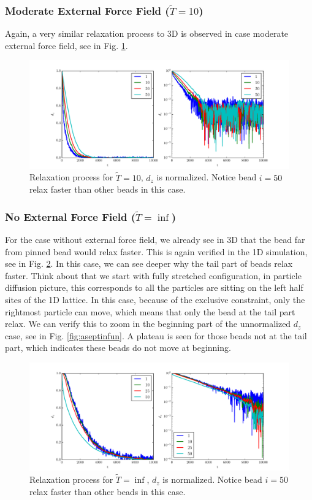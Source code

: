 \documentclass[12pt,a4paper]{article}
\begin{document}
\subsubsection{Moderate External Force Field ($\tilde{T} = 10$)}
Again, a very similar relaxation process to 3D is observed in case moderate
external force field, see in Fig. \ref{fig:asept10}.
\begin{figure}[htpb]
    \centering
    \includegraphics[width=1.0\linewidth]{fig4report/asep_N100_T10.pdf}
    \caption{Relaxation process for $\tilde{T}=10$, $d_z$ is normalized.
        Notice bead $i=50$ relax faster than other beads in this case.} 
    \label{fig:asept10}
\end{figure}

\subsubsection{No External Force Field ($\tilde{T}=\inf$)}
\label{sec:1dtinf}
For the case without external force field, we already see in 3D that the bead
far from pinned bead would relax faster. This is again verified in the 1D
simulation, see in Fig. \ref{fig:aseptinf}. In this case, we can see deeper why
the tail part of beads relax faster. Think about that we start with fully stretched
configuration, in particle diffusion picture, this corresponds to all the
particles are sitting on the left half sites of the 1D lattice. In this case,
because of the exclusive constraint, only the rightmost particle can move, which
means that only the bead at the tail part relax. We can verify this to zoom in
the beginning part of the unnormalized $d_z$ case, see in Fig.
\ref{fig:aseptinfun}. A plateau is seen for those beads not at the tail part,
which indicates these beads do not move at beginning.
\begin{figure}[htpb]
    \centering
    \includegraphics[width=1.0\linewidth]{fig4report/asep_N100_Tinf.pdf}
    \caption{Relaxation process for $\tilde{T}=\inf$, $d_z$ is normalized.
        Notice bead $i=50$ relax faster than other beads in this case.} 
    \label{fig:aseptinf}
\end{figure}
\end{document}
